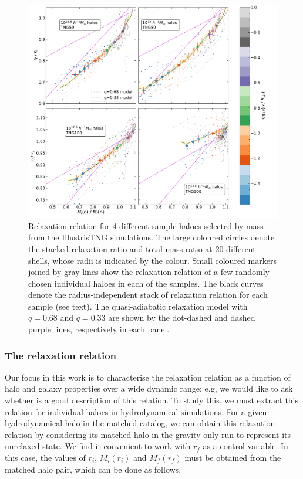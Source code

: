 \begin{figure}
    \centering
    \includegraphics[width=\linewidth,trim={0 0 2cm 0},clip]{plots/indv_relx-reln_all.pdf}
    \caption{Relaxation relation for 4 different sample haloes selected by mass from the IllustrisTNG simulations. The large coloured circles denote the stacked relaxation ratio and total mass ratio at 20 different shells, whose radii is indicated by the colour. Small coloured markers joined by gray lines show the relaxation relation of a few randomly chosen individual haloes in each of the samples. The black curves denote the radius-independent stack of relaxation relation for each sample (see text). The quasi-adiabatic relaxation model  with $q=0.68$ and $q=0.33$ are shown by the dot-dashed and dashed purple lines, respectively in each panel.} 
    \label{fig:relx-results-simple-ch:simbase}
\end{figure}

\subsubsection{The relaxation relation} %
\label{sec:methods-relx-reln-ch:simbase}
Our focus in this work is to characterise the relaxation relation  as a function of halo and galaxy properties over a wide dynamic range; e.g, we would like to ask whether  is a good description of this relation.
To study this, we must extract this relation for individual haloes in hydrodynamical simulations.
For a given hydrodynamical halo in the matched catalog, we can obtain this relaxation relation by considering its matched halo in the gravity-only run to represent its unrelaxed state. 
We find it convenient to work with $r_f$ as a control variable. In this case, the values of $r_i$, $M_i(r_i)$ and $M_f(r_f)$ must be obtained from the matched halo pair, which can be done as follows.


